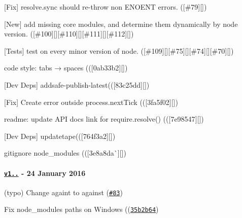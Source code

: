 \begin{DoxyItemize}
\item \mbox{[}Fix\mbox{]} {\ttfamily resolve.\+sync} should re-\/throw non {\ttfamily E\+N\+O\+E\+NT errors. (\mbox{[}}\#79{\ttfamily \mbox{]}\mbox{[}\mbox{]})}
\item {\ttfamily \mbox{[}New\mbox{]} add missing core modules, and determine them dynamically by node version. (\mbox{[}}\#100{\ttfamily \mbox{]}\mbox{[}\mbox{]}\mbox{[}}\#110{\ttfamily \mbox{]}\mbox{[}\mbox{]}\mbox{[}}\#111{\ttfamily \mbox{]}\mbox{[}\mbox{]}\mbox{[}}\#112{\ttfamily \mbox{]}\mbox{[}\mbox{]})}
\item {\ttfamily \mbox{[}Tests\mbox{]} test on every minor version of node. (\mbox{[}}\#109{\ttfamily \mbox{]}\mbox{[}\mbox{]}\mbox{[}}\#75{\ttfamily \mbox{]}\mbox{[}\mbox{]}\mbox{[}}\#74{\ttfamily \mbox{]}\mbox{[}\mbox{]}\mbox{[}}\#70{\ttfamily \mbox{]}\mbox{[}\mbox{]})}
\item {\ttfamily code style\+: tabs → spaces ((\mbox{[}}0ab33b2{\ttfamily \mbox{]}\mbox{[}\mbox{]})}
\item {\ttfamily \mbox{[}Dev Deps\mbox{]} add}safe-\/publish-\/latest{\ttfamily ((\mbox{[}}83c25dd{\ttfamily \mbox{]}\mbox{[}\mbox{]})}
\item {\ttfamily \mbox{[}Fix\mbox{]} Create error outside process.\+next\+Tick ((\mbox{[}}3fa5f02{\ttfamily \mbox{]}\mbox{[}\mbox{]})}
\item {\ttfamily readme\+: update A\+PI docs link for require.\+resolve() ((\mbox{[}}7e98547{\ttfamily \mbox{]}\mbox{[}\mbox{]})}
\item {\ttfamily \mbox{[}Dev Deps\mbox{]} update}tape{\ttfamily ((\mbox{[}}764f3a2{\ttfamily \mbox{]}\mbox{[}\mbox{]})}
\item {\ttfamily gitignore node\+\_\+modules ((\mbox{[}}3e8a8da\`{}\mbox{]}\mbox{[}\mbox{]})
\end{DoxyItemize}

\paragraph*{\href{https://github.com/browserify/resolve/compare/v1.1.6...v1.1.7}{\tt v1..} -\/ 24 January 2016}


\begin{DoxyItemize}
\item (typo) Change againt to against (\href{https://github.com/browserify/resolve/pull/83}{\tt {\ttfamily \#83}})
\item Fix node\+\_\+modules paths on Windows ((\href{https://github.com/browserify/resolve/commit/35b2b642d91e9b81e7cc26b6fd19912e18901d55}{\tt {\ttfamily 35b2b64}})
\end{DoxyItemize}

